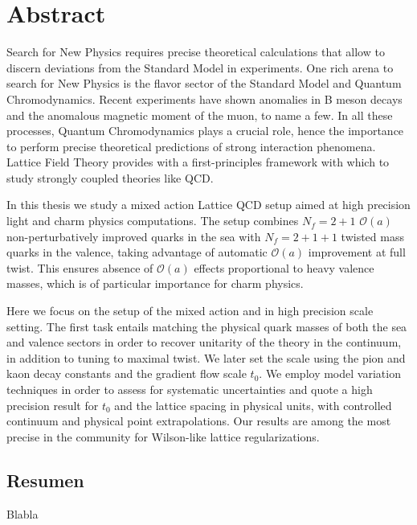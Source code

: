 \begingroup
\let\clearpage\relax
\let\cleardoublepage\relax
\let\cleardoublepage\relax

\chapter*{Abstract}
Search for New Physics requires precise theoretical calculations that allow to discern deviations from the Standard Model in experiments. One rich arena to search for New Physics is the flavor sector of the Standard Model and Quantum Chromodynamics. Recent experiments have shown anomalies in B meson decays and the anomalous magnetic moment of the muon, to name a few. In all these processes, Quantum Chromodynamics plays a crucial role, hence the importance to perform precise theoretical predictions of strong interaction phenomena. Lattice Field Theory provides with a first-principles framework with which to study strongly coupled theories like QCD.

In this thesis we study a mixed action Lattice QCD setup aimed at high precision light and charm physics computations. The setup combines $N_f=2+1$ $\mathcal{O}(a)$ non-perturbatively improved quarks in the sea with $N_f=2+1+1$ twisted mass quarks in the valence, taking advantage of automatic $\mathcal{O}(a)$ improvement at full twist. This ensures absence of $\mathcal{O}(a)$ effects proportional to heavy valence masses, which is of particular importance for charm physics. 

Here we focus on the setup of the mixed action and in high precision scale setting. The first task entails matching the physical quark masses of both the sea and valence sectors in order to recover unitarity of the theory in the continuum, in addition to tuning to maximal twist. We later set the scale using the pion and kaon decay constants and the gradient flow scale $t_0$. We employ model variation techniques in order to assess for systematic uncertainties and quote a high precision result for $t_0$ and the lattice spacing in physical units, with controlled continuum and physical point extrapolations. Our results are among the most precise in the community for Wilson-like lattice regularizations.

\vfill

\begin{otherlanguage}{spanish}
\chapter*{Resumen}
Blabla
\end{otherlanguage}

\endgroup

\vfill

